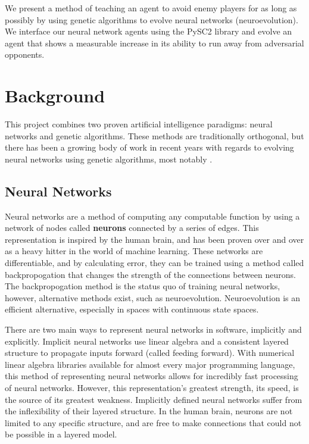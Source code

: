 \documentclass{article}
\begin{document}
We present a method of teaching an agent to avoid enemy players for as long as
possibly by using genetic algorithms to evolve neural networks (neuroevolution).
We interface our neural network agents using the PySC2 library and evolve an
agent that shows a measurable increase in its ability to run away from
adversarial opponents.

\section{Background}
This project combines two proven artificial intelligence paradigms: neural
networks and genetic algorithms. These methods are traditionally orthogonal,
but there has been a growing body of work in recent years with regards to
evolving neural networks using genetic algorithms, most notably \cite{NEAT}.

\subsection{Neural Networks}
Neural networks are a method of computing any computable function by using a
network of nodes called \textbf{neurons} connected by a series of edges. This
representation is inspired by the human brain, and has been proven over and over
as a heavy hitter in the world of machine learning. These networks are
differentiable, and by calculating error, they can be trained using a method
called backpropogation that changes the strength of the connections between
neurons. The backpropogation method is the status quo of training neural
networks, however, alternative methods exist, such as neuroevolution.
Neuroevolution is an efficient alternative, especially in spaces with
continuous state spaces.

There are two main ways to represent neural networks in software, implicitly and
explicitly. Implicit neural networks use linear algebra and a consistent layered
structure to propagate inputs forward (called feeding forward). With numerical
linear algebra libraries available for almost every major programming language,
this method of representing neural networks allows for incredibly fast
processing
of neural networks. However, this representation's greatest strength, its speed,
is the source of its greatest weakness. Implicitly defined neural networks
suffer
from the inflexibility of their layered structure. In the human brain, neurons
are not limited to any specific structure, and are free to make connections
that could not be possible in a layered model.
\end{document}
